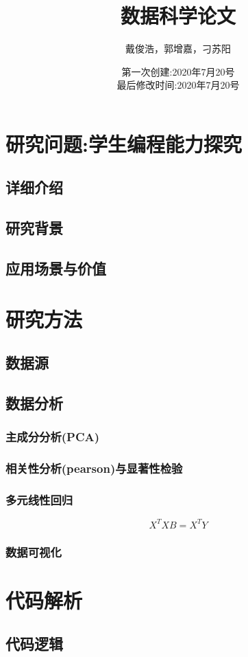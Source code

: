 \documentclass[a4paper]{article}
\title{数据科学论文}
\author{戴俊浩，郭增嘉，刁苏阳}
\date{第一次创建:2020年7月20号\\最后修改时间:2020年7月20号}
\begin{document}
\maketitle
\section{研究问题:学生编程能力探究}
\subsection{详细介绍}
\subsection{研究背景}
\subsection{应用场景与价值}
\section{研究方法}
\subsection{数据源}
\subsection{数据分析}
\subsubsection{主成分分析(PCA)}
\subsubsection{相关性分析(pearson)与显著性检验}
\subsubsection{多元线性回归}
$$X^TXB=X^TY$$
\subsubsection{数据可视化}
\section{代码解析}
\subsection{代码逻辑}
\end{document}
